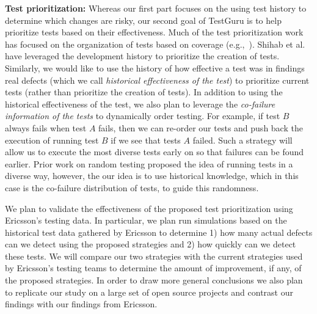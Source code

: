 \textbf{Test prioritization:} Whereas our first part focuses on the using test history to determine which changes are risky, our second goal of TestGuru is to help prioritize tests based on their effectiveness. Much of the test prioritization work has focused on the organization of tests based on coverage (e.g.,~\cite{AggrawalSEN04}).  Shihab et al. have leveraged the development history to prioritize the creation of tests. Similarly, we would like to use the history of how effective a test was in findings real defects (which we call \emph{historical effectiveness of the test}) to prioritize current tests (rather than prioritize the creation of tests). In addition to using the historical effectiveness of the test, we also plan to leverage the \emph{co-failure information of the tests} to dynamically order testing. For example, if test $B$ always fails when test $A$ fails, then we can re-order our tests and push back the execution of running test $B$ if we see that tests $A$ failed. Such a strategy will allow us to execute the most diverse tests early on so that failures can be found earlier. Prior work on random testing \cite{Duran84TSE, Arcuri2012TSE} proposed the idea of running tests in a diverse way, however, the our idea is to use historical knowledge, which in this case is the co-failure distribution of tests, to guide this randomness. 

We plan to validate the effectiveness of the proposed test prioritization using Ericsson's testing data. In particular, we plan run simulations based on the historical test data gathered by Ericsson to determine 1) how many actual defects can we detect using the proposed strategies and 2) how quickly can we detect these tests. We will compare our two strategies with the current strategies used by Ericsson's testing teams to determine the amount of improvement, if any, of the proposed strategies. In order to draw more general conclusions we also plan to replicate our study on a large set of open source projects and contrast our findings with our findings from Ericsson. 


